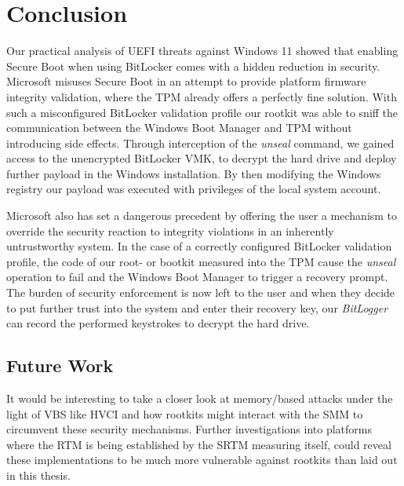 
\chapter{Conclusion}
\label{sec:conclusion}

Our practical analysis of \ac{UEFI} threats against Windows 11 showed that enabling Secure Boot when using BitLocker comes with a hidden reduction in security.
Microsoft misuses Secure Boot in an attempt to provide platform firmware integrity validation, where the \ac{TPM} already offers a perfectly fine solution.
With such a misconfigured BitLocker validation profile our rootkit was able to sniff the communication between the Windows Boot Manager and \ac{TPM} without introducing side effects.
Through interception of the \emph{unseal} command, we gained access to the unencrypted BitLocker \ac{VMK}, to decrypt the hard drive and deploy further payload in the Windows installation.
By then modifying the Windows registry our payload was executed with privileges of the local system account.

Microsoft also has set a dangerous precedent by offering the user a mechanism to override the security reaction to integrity violations in an inherently untrustworthy system.
In the case of a correctly configured BitLocker validation profile, the code of our root- or bootkit measured into the \ac{TPM} cause the \emph{unseal} operation to fail and the Windows Boot Manager to trigger a recovery prompt.
The burden of security enforcement is now left to the user and when they decide to put further trust into the system and enter their recovery key, our \emph{BitLogger} can record the performed keystrokes to decrypt the hard drive.

\section*{Future Work}

It would be interesting to take a closer look at memory\-/based attacks under the light of \ac{VBS} like \ac{HVCI} and how rootkits might interact with the \ac{SMM} to circumvent these security mechanisms.
Further investigations into platforms where the \ac{RTM} is being established by the \ac{SRTM} measuring itself, could reveal these implementations to be much more vulnerable against rootkits than laid out in this thesis.